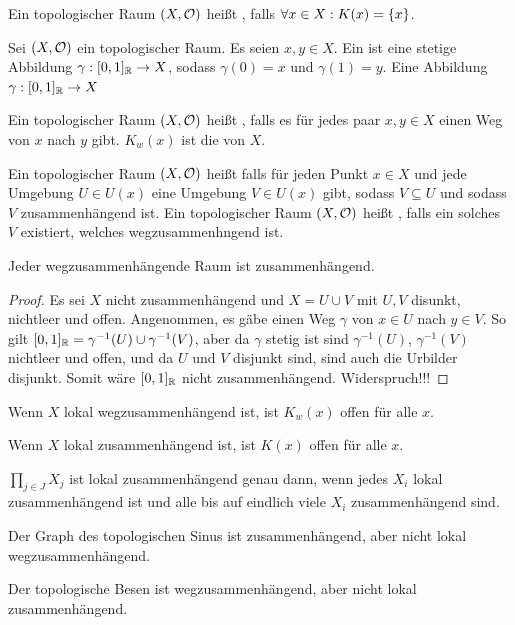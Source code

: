 \documentclass{report}
\begin{document}
\begin{theorem}
	Ein topologischer Raum $(X, \mathcal{O})$ heißt , falls $\forall x \in X : K(x) = \qty{x}$.
\end{theorem}
\begin{definition}
	Sei $(X, \mathcal{O})$ ein topologischer Raum. Es seien $x, y \in X$. Ein  ist eine stetige Abbildung $\gamma : [0,1]_{\mathbb{R}} \to X$, sodass $\gamma(0) = x$ und $\gamma(1) = y$.
	Eine Abbildung $\gamma : [0,1]_{\mathbb{R}} \to X$ 
\end{definition}
\begin{definition}
	Ein topologischer Raum $(X, \mathcal{O})$ heißt , falls es für jedes paar $x, y \in X$ einen Weg von $x$ nach $y$ gibt. $K_w(x)$ ist die  von $X$.
\end{definition}
\begin{definition}
	Ein topologischer Raum $(X, \mathcal{O})$ heißt  falls für jeden Punkt $x \in X$ und jede Umgebung $U \in U(x)$ eine Umgebung $V \in U(x)$ gibt, sodass $V \subseteq U$ und sodass $V$ zusammenhängend ist. Ein topologischer Raum $(X, \mathcal{O})$ heißt , falls ein solches $V$ existiert, welches wegzusammenhngend ist.
\end{definition}
\begin{theorem}
	Jeder wegzusammenhängende Raum ist zusammenhängend.
\end{theorem}
\begin{proof}
	Es sei $X$ nicht zusammenhängend und $X = U \cup V$ mit $U,V$ disunkt, nichtleer und offen. Angenommen, es gäbe einen Weg $\gamma$ von $x \in U$ nach $y \in V$. So gilt $[0,1]_{\mathbb{R}} = \gamma^{-1}(U) \cup \gamma^{-1}(V)$, aber da $\gamma$ stetig ist sind $\gamma^{-1}(U)$, $\gamma^{-1}(V)$ nichtleer und offen, und da $U$ und $V$ disjunkt sind, sind auch die Urbilder disjunkt. Somit wäre $[0,1]_{\mathbb{R}}$ nicht zusammenhängend. Widerspruch!!!
\end{proof}
\begin{theorem}
	Wenn $X$ lokal wegzusammenhängend ist, ist $K_w(x)$ offen für alle $x$.
\end{theorem}
\begin{theorem}
	Wenn $X$ lokal zusammenhängend ist, ist $K(x)$ offen für alle $x$.
\end{theorem}
\begin{theorem}
	$\prod_{j \in J} X_j$ ist lokal zusammenhängend genau dann, wenn jedes $X_i$ lokal zusammenhängend ist und alle bis auf eindlich viele $X_i$ zusammenhängend sind.
\end{theorem}
\begin{theorem}
	Der Graph des topologischen Sinus ist zusammenhängend, aber nicht lokal wegzusammenhängend.
\end{theorem}
\begin{theorem}
	Der topologische Besen ist wegzusammenhängend, aber nicht lokal zusammenhängend.
\end{theorem}
\end{document}
